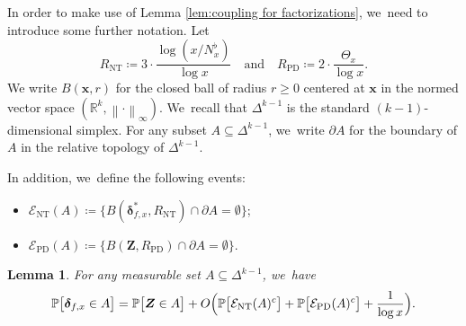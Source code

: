 \documentclass[10pt,a4paper]{amsart}
\newcommand{\bx}{{\boldsymbol x}}
\newcommand{\bZ}{{\boldsymbol Z}}
\newcommand{\RR}{\mathbb{R}}
\newcommand{\PP}{\mathbb{P}}
\newcommand{\bolddelta}{\boldsymbol{\delta}}
\newcommand{\EC}{\mathcal{E}}
\newcommand{\maxnorm}[1]{\left\| #1 \right\|_{\infty}}
\newcommand{\simplex}{\Delta^{k-1}}
\newcommand{\bg}{\big}
\newcommand{\Rnt}{R_{\mathrm{NT}}}
\newcommand{\Rprob}{R_{\mathrm{PD}}}
\newcommand{\ECnt}{\EC_{\mathrm{NT}}}
\newcommand{\ECprob}{\EC_{\mathrm{PD}}}
\theoremstyle{plain}
\newtheorem{lem}[cor]{Lemma}
\theoremstyle{definition}
\begin{document}
In order to make use of Lemma \ref{lem:coupling for factorizations}, we~need to introduce some further notation. Let
\[
\Rnt \coloneqq 3\cdot \frac{\log(x/N_x^\flat)}{\log x} \quad \text{and} \quad \Rprob \coloneqq 2\cdot \frac{\Theta_x}{\log x}.
\]
We write $B(\bx,r)$ for the closed ball of radius $r \ge 0$ centered at $\bx$ in the normed vector space $(\RR^k, \maxnorm{\cdot})$. We~recall that $\simplex$ is the standard $(k-1)$-dimensional simplex. For any subset $A \subseteq \simplex$, we~write $\partial A$ for the boundary of $A$ in the relative topology of $\simplex$.

In addition, we~define the following events:
\begin{itemize}
\item $\ECnt(A) \coloneqq \bg\{ B(\bolddelta_{f, x}^*, \Rnt)\cap \partial A=\emptyset\bg\}$;

\item $\ECprob(A) \coloneqq \bg\{ B(\bZ, \Rprob) \cap \partial A = \emptyset \bg\}$.
\end{itemize}

\begin{lem}
\label{lem:sym diff D and Z}
For any measurable set $A\subseteq\simplex$, we~have
\[
\PP\bg[\bolddelta_{f, x} \in A\bg] = \PP\bg[\bZ \in A\bg] + O\Bigl(\PP\bg[\ECnt(A)^c\bg] + \PP\bg[\ECprob(A)^c\bg] + \frac{1}{\log x}\Bigr).
\]
\end{lem}
\end{document}
